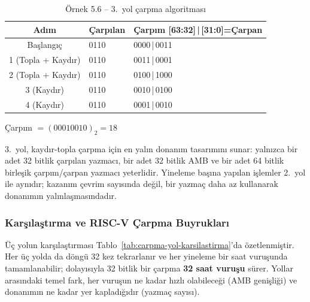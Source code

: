 \begin{ornek}[5.6]
\begin{table}[H]
\centering
\caption{Örnek 5.6 -- 3.\ yol çarpma algoritması}
\label{tab:carpma3-ornek}
\small
\begin{tabular}{c l l}
\toprule
\textbf{Adım} & \textbf{\textcolor{vurgumavi}{Çarpılan}} & \textbf{\textcolor{vurguyesil}{Çarpım [63:32]}\,|\,\textcolor{vurgukirmizi}{[31:0]=Çarpan}} \\
\midrule
Başlangıç & \textcolor{vurgumavi}{0110} & \textcolor{vurguyesil}{0000}\,|\,\textcolor{vurgukirmizi}{0011} \\
1 (Topla + Kaydır) & \textcolor{vurgumavi}{0110} & \textcolor{vurguyesil}{0011}\,|\,\textcolor{vurguyesil}{0}\textcolor{vurgukirmizi}{001} \\
2 (Topla + Kaydır) & \textcolor{vurgumavi}{0110} & \textcolor{vurguyesil}{0100}\,|\,\textcolor{vurguyesil}{10}\textcolor{vurgukirmizi}{00} \\
3 (Kaydır) & \textcolor{vurgumavi}{0110} & \textcolor{vurguyesil}{0010}\,|\,\textcolor{vurguyesil}{010}\textcolor{vurgukirmizi}{0} \\
4 (Kaydır) & \textcolor{vurgumavi}{0110} & \textcolor{vurguyesil}{0001}\,|\,\textcolor{vurguyesil}{0010} \\
\bottomrule
\end{tabular}
\end{table}

Çarpım $= (00010010)_2 = 18$
\end{ornek}

3.\ yol, kaydır-topla çarpma için en yalın donanım tasarımını sunar: yalnızca bir adet 32 bitlik çarpılan yazmacı, bir adet 32 bitlik AMB ve bir adet 64 bitlik birleşik çarpım/çarpan yazmacı yeterlidir. Yineleme başına yapılan işlemler 2.\ yol ile aynıdır; kazanım çevrim sayısında değil, bir yazmaç daha az kullanarak donanımın yalınlaşmasındadır.

\subsubsection{Karşılaştırma ve RISC-V Çarpma Buyrukları}

Üç yolun karşılaştırması Tablo~\ref{tab:carpma-yol-karsilastirma}'da özetlenmiştir. Her üç yolda da döngü 32 kez tekrarlanır ve her yineleme bir saat vuruşunda tamamlanabilir; dolayısıyla 32 bitlik bir çarpma \textbf{32 saat vuruşu} sürer. Yollar arasındaki temel fark, her vuruşun ne kadar hızlı olabileceği (AMB genişliği) ve donanımın ne kadar yer kapladığıdır (yazmaç sayısı).

